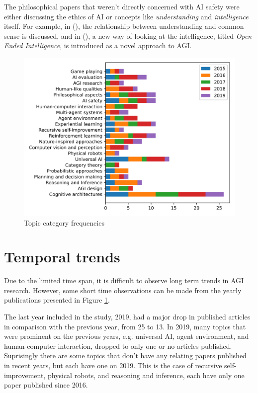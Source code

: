 \documentclass[utf8,english]{gradu3}
\begin{document}
The philosophical papers that weren't directly concerned with AI safety were
either discussing the ethics of AI or concepts like \emph{understanding} and
\emph{intelligence} itself. For example, in (\cite{thorisson2017understanding}),
the relationship between understanding and common sense is discussed, and in
(\cite[]{weinbaum2016Oopenended}), a new way of looking at the intelligence,
titled \emph{Open-Ended Intelligence}, is introduced as a novel approach to AGI.


\begin{figure}[H]
  \centering
  \includegraphics[scale=0.8]{material/data/topic_frequencies_by_year.png}
  \caption{Topic category frequencies}
  \label{fig:topicbar}
\end{figure}

\section{Temporal trends}

Due to the limited time span, it is difficult to observe long term trends in AGI
research. However, some short time observations can be made from the yearly
publications presented in Figure \ref{fig:topicbar}. 

The last year included in the study, 2019, had a major drop in published
articles in comparison with the previous year, from 25 to 13. In 2019, many
topics that were prominent on the previous years, e.g. universal AI, agent
environment, and human-computer interaction, dropped to only one or no
articles published. Suprisingly there are some topics that don't have any
relating papers published in recent years, but each have one on 2019. This is
the case of recursive self-improvement, physical robots, and reasoning and
inference, each have only one paper published since 2016.
\end{document}

